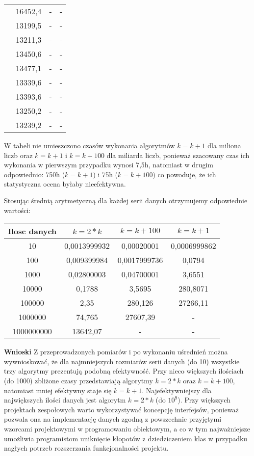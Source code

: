 \documentclass[10pt, a4paper]{article}
\begin{document}
\begin{flushleft}
\begin{table}[h]
\begin{tabular}{|c|c|c|c|}
 & 16452,4 & - & - \\
 & 13199,5 & - & - \\
 & 13211,3 & - & - \\
 & 13450,6 & - & - \\
 & 13477,1 & - & - \\
 & 13339,6 & - & - \\
 & 13393,6 & - & - \\
 & 13250,2 & - & - \\
 & 13239,2 & - & - \\ \hline
\end{tabular}
\end{table}

W tabeli nie umieszczono czasów wykonania algorytmów $k=k+1$ dla miliona liczb oraz $k=k+1$ i $k=k+100$ dla miliarda liczb, ponieważ szacowany czas ich wykonania w pierwszym przypadku wynosi 7,5h, natomiast w drugim odpowiednio: 750h ($k=k+1$) i 75h ($k=k+100$) co powoduje, że ich statystyczna ocena byłaby nieefektywna.

\newpage

Stosując średnią arytmetyczną dla każdej serii danych otrzymujemy odpowiednie wartości:
\begin{table}[h]
\centering
\begin{tabular}{|c|c|c|c|} \hline
Ilosc danych & $k=2*k$ & $k=k+100$ & $k=k+1$ \\ \hline
10 & 0,0013999932 & 0,00020001 & 0,0006999862 \\ \hline
100 & 0,009399984 & 0,0017999736 & 0,0794 \\ \hline
1000 & 0,02800003 & 0,04700001 & 3,6551 \\ \hline
10000 & 0,1788 & 3,5695 & 280,8071 \\ \hline
100000 & 2,35 & 280,126 & 27266,11 \\ \hline
1000000 & 74,765 & 27607,39 & - \\ \hline
1000000000 & 13642,07 & - & - \\ \hline
\end{tabular}
\end{table}

\textbf{Wnioski} \newline \newline
Z przeprowadzonych pomiarów i po wykonaniu uśrednień można wywnioskować, że dla najmniejszych rozmiarów serii danych (do 10) wszystkie trzy algorytmy prezentują podobną efektywność. Przy nieco większych ilościach (do 1000) zbliżone czasy przedstawiają algorytmy $k=2*k$ oraz $k=k+100$, natomiast mniej efektywny staje się $k=k+1$. Najefektywniejszy dla największych ilości danych jest algorytm $k=2*k$ (do $10^9$). \newline \newline
Przy większych projektach zespołowych warto wykorzystywać koncepcję interfejsów, ponieważ pozwala ona na implementację danych zgodną z powszechnie przyjętymi wzorcami projektowymi w programowaniu obiektowym, a co w tym najważniejsze umożliwia programistom uniknięcie kłopotów z dziedziczeniem klas w przypadku nagłych potrzeb rozszerzania funkcjonalności projektu.

\end{flushleft}
\end{document}
